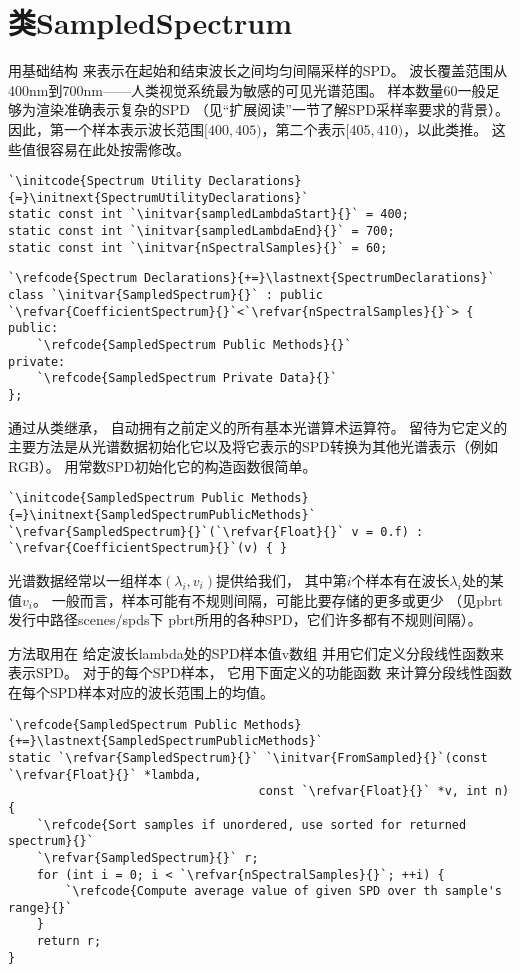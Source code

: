 \section{类SampledSpectrum}\label{sec:类SampledSpectrum}
用基础结构
来表示在起始和结束波长之间均匀间隔采样的SPD。
波长覆盖范围从400nm到700nm——人类视觉系统最为敏感的可见光谱范围。
样本数量60一般足够为渲染准确表示复杂的SPD
（见“扩展阅读”一节了解SPD采样率要求的背景）。
因此，第一个样本表示波长范围$[400,405)$，第二个表示$[405,410)$，以此类推。
这些值很容易在此处按需修改。
\begin{lstlisting}
`\initcode{Spectrum Utility Declarations}{=}\initnext{SpectrumUtilityDeclarations}`
static const int `\initvar{sampledLambdaStart}{}` = 400;
static const int `\initvar{sampledLambdaEnd}{}` = 700;
static const int `\initvar{nSpectralSamples}{}` = 60;
\end{lstlisting}
\begin{lstlisting}
`\refcode{Spectrum Declarations}{+=}\lastnext{SpectrumDeclarations}`
class `\initvar{SampledSpectrum}{}` : public `\refvar{CoefficientSpectrum}{}`<`\refvar{nSpectralSamples}{}`> {
public:
    `\refcode{SampledSpectrum Public Methods}{}`
private:
    `\refcode{SampledSpectrum Private Data}{}`
};
\end{lstlisting}

通过从类继承，
自动拥有之前定义的所有基本光谱算术运算符。
留待为它定义的主要方法是从光谱数据初始化它以及将它表示的SPD转换为其他光谱表示（例如RGB）。
用常数SPD初始化它的构造函数很简单。
\begin{lstlisting}
`\initcode{SampledSpectrum Public Methods}{=}\initnext{SampledSpectrumPublicMethods}`
`\refvar{SampledSpectrum}{}`(`\refvar{Float}{}` v = 0.f) : `\refvar{CoefficientSpectrum}{}`(v) { }
\end{lstlisting}

光谱数据经常以一组样本$(\lambda_i,v_i)$提供给我们，
其中第$i$个样本有在波长$\lambda_i$处的某值$v_i$。
一般而言，样本可能有不规则间隔，可能比要存储的更多或更少
（见pbrt发行中路径{\ttfamily scenes/spds}下
pbrt所用的各种SPD，它们许多都有不规则间隔）。

方法取用在
给定波长{\ttfamily lambda}处的SPD样本值{\ttfamily v}数组
并用它们定义分段线性函数来表示SPD。
对于的每个SPD样本，
它用下面定义的功能函数
来计算分段线性函数在每个SPD样本对应的波长范围上的均值。
\begin{lstlisting}
`\refcode{SampledSpectrum Public Methods}{+=}\lastnext{SampledSpectrumPublicMethods}`
static `\refvar{SampledSpectrum}{}` `\initvar{FromSampled}{}`(const `\refvar{Float}{}` *lambda,
                                   const `\refvar{Float}{}` *v, int n) {
    `\refcode{Sort samples if unordered, use sorted for returned spectrum}{}`
    `\refvar{SampledSpectrum}{}` r;
    for (int i = 0; i < `\refvar{nSpectralSamples}{}`; ++i) {
        `\refcode{Compute average value of given SPD over th sample's range}{}`
    }
    return r;
}
\end{lstlisting}

